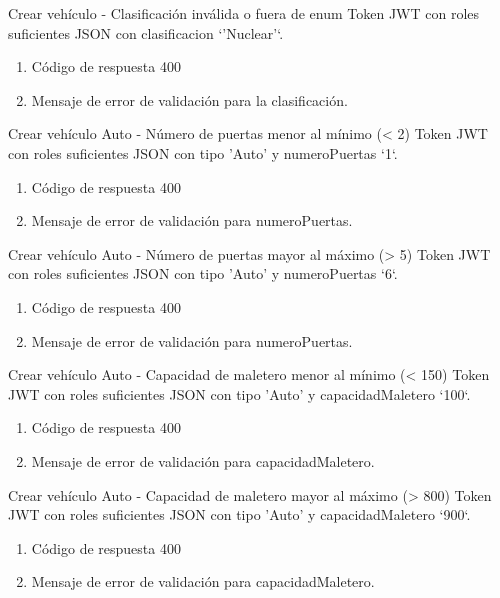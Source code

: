 {Crear vehículo - Clasificación inválida o fuera de enum}
{Token JWT con roles suficientes}
{JSON con clasificacion `'Nuclear'`.}
{\begin{enumerate} [leftmargin=*, nosep]
    \item Código de respuesta 400
    \item Mensaje de error de validación para la clasificación.
\end{enumerate}}

{Crear vehículo Auto - Número de puertas menor al mínimo (< 2)}
{Token JWT con roles suficientes}
{JSON con tipo 'Auto' y numeroPuertas `1`.}
{\begin{enumerate} [leftmargin=*, nosep]
    \item Código de respuesta 400
    \item Mensaje de error de validación para numeroPuertas.
\end{enumerate}}

{Crear vehículo Auto - Número de puertas mayor al máximo (> 5)}
{Token JWT con roles suficientes}
{JSON con tipo 'Auto' y numeroPuertas `6`.}
{\begin{enumerate} [leftmargin=*, nosep]
    \item Código de respuesta 400
    \item Mensaje de error de validación para numeroPuertas.
\end{enumerate}}

{Crear vehículo Auto - Capacidad de maletero menor al mínimo (< 150)}
{Token JWT con roles suficientes}
{JSON con tipo 'Auto' y capacidadMaletero `100`.}
{\begin{enumerate} [leftmargin=*, nosep]
    \item Código de respuesta 400
    \item Mensaje de error de validación para capacidadMaletero.
\end{enumerate}}

{Crear vehículo Auto - Capacidad de maletero mayor al máximo (> 800)}
{Token JWT con roles suficientes}
{JSON con tipo 'Auto' y capacidadMaletero `900`.}
{\begin{enumerate} [leftmargin=*, nosep]
    \item Código de respuesta 400
    \item Mensaje de error de validación para capacidadMaletero.
\end{enumerate}}


